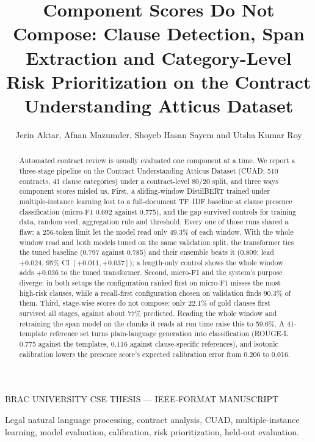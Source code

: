 \documentclass[journal]{IEEEtran}
\begin{document}
\title{Component Scores Do Not Compose: Clause Detection, Span
Extraction and Category-Level Risk Prioritization on the
Contract Understanding Atticus Dataset}

\author{Jerin Aktar, Afnan Mazumder, Shoyeb Hasan Sayem and Utsha Kumar Roy}

%
{BRAC UNIVERSITY CSE THESIS --- IEEE-FORMAT MANUSCRIPT}

\maketitle

\begin{abstract}
Automated contract review is usually evaluated one component at a time. We report a three-stage
pipeline on the Contract Understanding Atticus Dataset (CUAD; 510 contracts, 41 clause categories)
under a contract-level 80/20 split, and three ways component scores misled us. First, a
sliding-window DistilBERT trained under multiple-instance learning lost to a full-document TF--IDF
baseline at clause presence classification (micro-F1 0.692 against 0.775), and the gap survived
controls for training data, random seed, aggregation rule and threshold. Every one of those runs
shared a flaw: a 256-token limit let the model read only 49.3\% of each window. With the whole
window read and both models tuned on the same validation split, the transformer ties the tuned
baseline (0.797 against 0.785) and their ensemble beats it (0.809; lead $+0.024$, 95\% CI
$[+0.011,+0.037]$); a length-only control shows the whole window adds $+0.036$ to the tuned transformer. Second, micro-F1 and the system's purpose diverge: in both setups the configuration ranked
first on micro-F1 misses the most high-risk clauses, while a recall-first configuration chosen on
validation finds 90.3\% of them. Third, stage-wise scores do not compose: only 22.1\% of gold
clauses first survived all stages, against about 77\% predicted. Reading the whole window and
retraining the span model on the chunks it reads at run time raise this to 59.6\%. A 41-template reference set turns plain-language
generation into classification (ROUGE-L 0.775 against the templates, 0.116 against clause-specific
references), and isotonic calibration lowers the presence score's expected calibration error
from 0.206 to 0.016.
\end{abstract}

\begin{IEEEkeywords}
Legal natural language processing, contract analysis, CUAD, multiple-instance learning, model
evaluation, calibration, risk prioritization, held-out evaluation.
\end{IEEEkeywords}
\end{document}
